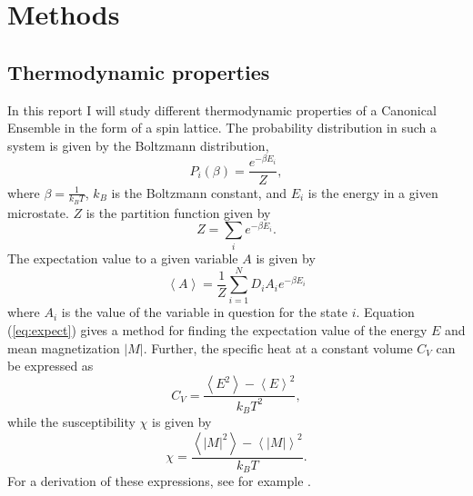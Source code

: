 \section{Methods}
\label{sec:methods}

\subsection{Thermodynamic properties}
In this report I will study different thermodynamic properties of a Canonical Ensemble in the form of a spin lattice. The probability distribution in such a system is given by the Boltzmann distribution,  
\begin{equation}\label{eq:prob}
	P_i(\beta) =  \frac{e^{-\beta E_i}}{Z},
\end{equation}
where $\beta = \frac{1}{k_B T}$, $k_B$ is the Boltzmann constant, and $E_i$ is the energy in a given microstate. $Z$ is the partition function given by 
\begin{equation}
 Z = \sum_{i}  e^{-\beta E_i}.
\end{equation}
 The expectation value to a given variable $A$ is given by 
 \begin{equation}\label{eq:expect}
  \left\langle A\right\rangle = \frac{1}{Z}\sum_{i=1}^{N} D_i A_i  e^{- \beta E_i} 
 \end{equation}   
 where $A_i$ is the value of the variable in question for the state $i$. Equation (\ref{eq:expect}) gives a method for finding the expectation value of the energy $E$ and mean magnetization $|M|$. Further, the specific heat at a constant volume $C_V$ can be expressed as  
 \begin{equation}
	 C_V = \frac{\left\langle E^2\right\rangle - \left\langle E\right\rangle ^2}{k_BT^2},
 \end{equation}
 while the susceptibility $\chi$ is given by 
  \begin{equation}
  \chi = \frac{\left\langle |M|^2\right\rangle - \left\langle |M|\right\rangle ^2}{k_BT}.
  \end{equation}
 For a derivation of these expressions, see for example \cite{schroeder}.
 
